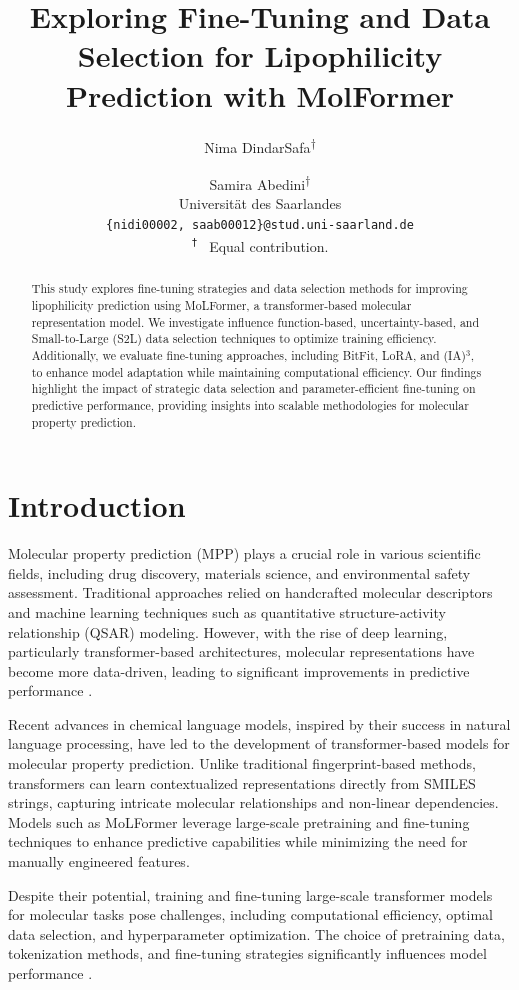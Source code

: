 \documentclass[11pt]{article}
\title{Exploring Fine-Tuning and Data Selection for Lipophilicity Prediction with MolFormer}
\author{
    Nima DindarSafa\textsuperscript{†} \and 
    Samira Abedini\textsuperscript{†} \\
    Universität des Saarlandes \\
    \texttt{\{nidi00002, saab00012\}@stud.uni-saarland.de}\\
    \texttt  \textsuperscript{†} \ Equal contribution.
}
\begin{document}
\maketitle
\begin{abstract}
This study explores fine-tuning strategies and data selection methods for improving lipophilicity prediction using MoLFormer, a transformer-based molecular representation model. We investigate influence function-based, uncertainty-based, and Small-to-Large (S2L) data selection techniques to optimize training efficiency. Additionally, we evaluate fine-tuning approaches, including BitFit, LoRA, and (IA)$^3$, to enhance model adaptation while maintaining computational efficiency. Our findings highlight the impact of strategic data selection and parameter-efficient fine-tuning on predictive performance, providing insights into scalable methodologies for molecular property prediction.
\end{abstract}

\section{Introduction}
Molecular property prediction (MPP) plays a crucial role in various scientific fields, including drug discovery, materials science, and environmental safety assessment. Traditional approaches relied on handcrafted molecular descriptors and machine learning techniques such as quantitative structure-activity relationship (QSAR) modeling. However, with the rise of deep learning, particularly transformer-based architectures, molecular representations have become more data-driven, leading to significant improvements in predictive performance​ 
.

Recent advances in chemical language models, inspired by their success in natural language processing, have led to the development of transformer-based models for molecular property prediction. Unlike traditional fingerprint-based methods, transformers can learn contextualized representations directly from SMILES strings, capturing intricate molecular relationships and non-linear dependencies. Models such as MoLFormer \cite{ross2022largescalechemicallanguagerepresentations} leverage large-scale pretraining and fine-tuning techniques to enhance predictive capabilities while minimizing the need for manually engineered features.

Despite their potential, training and fine-tuning large-scale transformer models for molecular tasks pose challenges, including computational efficiency, optimal data selection, and hyperparameter optimization. The choice of pretraining data, tokenization methods, and fine-tuning strategies significantly influences model performance \cite{sultan2024transformers}.
\end{document}
